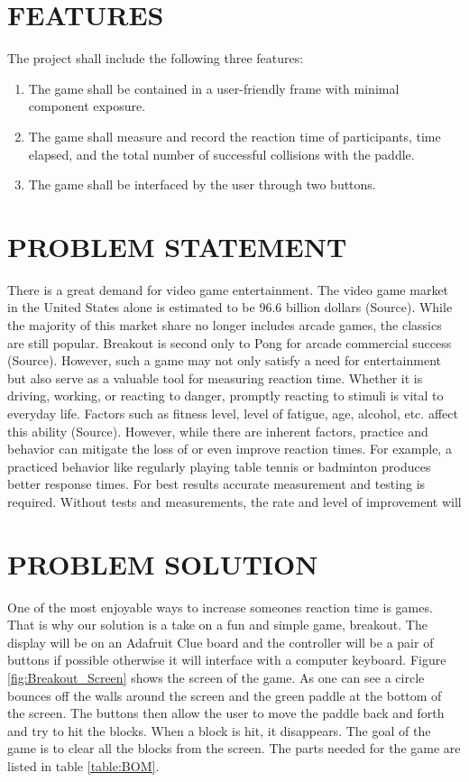 \documentclass[12pt]{article}
\begin{document}
\section{FEATURES}
The project shall include the following three features:

\begin{enumerate}
  \item The game shall be contained in a user-friendly frame with minimal component exposure.
  \item The game shall measure and record the reaction time of participants, time elapsed, and the total number of successful collisions with the paddle.
  \item The game shall be interfaced by the user through two buttons.
\end{enumerate}


\section{PROBLEM STATEMENT}

There is a great demand for video game entertainment. The video game market in the United States alone is estimated to be 96.6 billion dollars (Source). While the majority of this market 
share no longer includes arcade games, the classics are still popular. Breakout is second only to Pong for arcade commercial success (Source). However, such a game may not 
only satisfy a need for entertainment but also serve as a valuable tool for measuring reaction time. Whether it is driving, working, or reacting to danger, promptly reacting 
to stimuli is vital to everyday life. Factors such as fitness level, level of fatigue, age, alcohol, etc. affect this ability (Source).  However, while there are inherent 
factors, practice and behavior can mitigate the loss of or even improve reaction times. For example, a practiced behavior like regularly playing table tennis or badminton 
produces better response times. For best results accurate measurement and testing is required. Without tests and measurements, the rate and level of improvement will 


\section{PROBLEM SOLUTION}
One of the most enjoyable ways to increase someones reaction time is games. That is why our solution is a take on a fun and simple game, breakout. The display will be on an Adafruit Clue board and the controller will be a pair of buttons if possible otherwise it will interface with a computer keyboard. Figure \ref{fig:Breakout_Screen} shows the screen of the game. As one can see a circle bounces off the walls around the screen and the green paddle at the bottom of the screen. The buttons then allow the user to move the paddle back and forth and try to hit the blocks. When a block is hit, it disappears. The goal of the game is to clear all the blocks from the screen. The parts needed for the game are listed in table \ref{table:BOM}.
\end{document}
